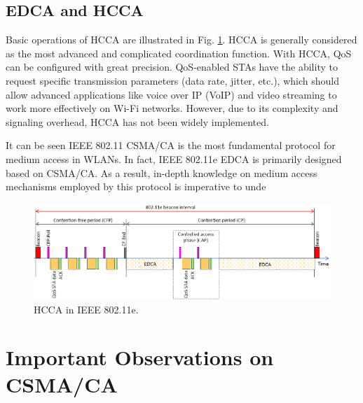 \subsection{EDCA and HCCA}
\label{edca-hcca}

Basic operations of HCCA are illustrated in Fig. \ref{figs:802-11e-HCCA}. HCCA is generally considered as the most advanced and complicated coordination function. With HCCA, QoS can be configured with great precision. QoS-enabled STAs have the ability to request specific transmission parameters (data rate, jitter, etc.), which should allow advanced applications like voice over IP (VoIP) and video streaming to work more effectively on Wi-Fi networks. However, due to its complexity and signaling overhead, HCCA has not been widely implemented.

It can be seen IEEE 802.11 CSMA/CA is the most fundamental protocol for medium access in WLANs. In fact, IEEE 802.11e EDCA is primarily designed based on CSMA/CA. As a result, in-depth knowledge on medium access mechanisms employed by this protocol is imperative to unde
\begin{figure}[!t]
	\centering
	\includegraphics[width=1.0\columnwidth]{figures2/802-11e-HCCA}
	\caption{HCCA in IEEE 802.11e.}
	\label{figs:802-11e-HCCA}
\end{figure}


\section{Important Observations on CSMA/CA}
\label{csmaca-obs}

